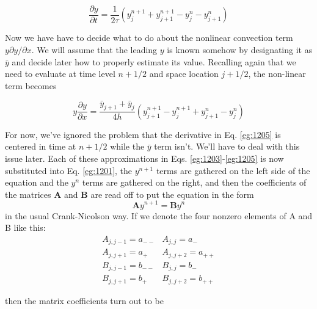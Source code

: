 \documentclass{book}
\theoremstyle{plain}
\theoremstyle{definition}
\numberwithin{exm}{chapter}
\theoremstyle{remark}
\theoremstyle{summary}
\theoremstyle{overview}
\begin{document}
\begin{equation}\label{eq:1204}
\frac{\partial y}{\partial t}=\frac{1}{2 \tau}\left(y_{j}^{n+1}+y_{j+1}^{n+1}-y_{j}^{n}-y_{j+1}^{n}\right)
\end{equation}

Now we have have to decide what to do about the nonlinear convection term $y \partial y / \partial x$. We will assume that the leading $y$ is known somehow by designating it as $\bar{y}$ and decide later how to properly estimate its value. Recalling again that we need to evaluate at time level $n+1 / 2$ and space location $j+1 / 2$, the non-linear term becomes

\begin{equation}\label{eq:1205}
y \frac{\partial y}{\partial x}=\frac{\bar{y}_{j+1}+\bar{y}_{j}}{4 h}\left(y_{j+1}^{n+1}-y_{j}^{n+1}+y_{j+1}^{n}-y_{j}^{n}\right)
\end{equation}

For now, we\rq ve ignored the problem that the derivative in Eq. \eqref{eg:1205} is centered in time at $n+1 / 2$ while the $\bar{y}$ term isn't. We\rq ll have to deal with this issue later.
Each of these approximations in Eqs. \eqref{eg:1203}-\eqref{eg:1205} is now substituted into Eq. \eqref{eg:1201}, the $y^{n+1}$ terms are gathered on the left side of the equation and the $y^{n}$ terms are gathered on the right, and then the coefficients of the matrices $\mathbf{A}$ and $\mathbf{B}$ are read off to put the equation in the form
\begin{equation}\label{eq:1206}
\mathbf{A} y^{n+1}=\mathbf{B} y^{n}
\end{equation}
in the usual Crank-Nicolson way. If we denote the four nonzero elements of A
and B like this:
\begin{equation}\label{eq:1207}
\begin{array}{ll}
A_{j, j-1}=a_{--} & A_{j, j}=a_{-} \\
A_{j, j+1}=a_{+} & A_{j, j+2}=a_{++} \\
B_{j, j-1}=b_{--} & B_{j, j}=b_{-} \\
B_{j, j+1}=b_{+} & B_{j, j+2}=b_{++}
\end{array}
\end{equation}

then the matrix coefficients turn out to be
\end{document}
